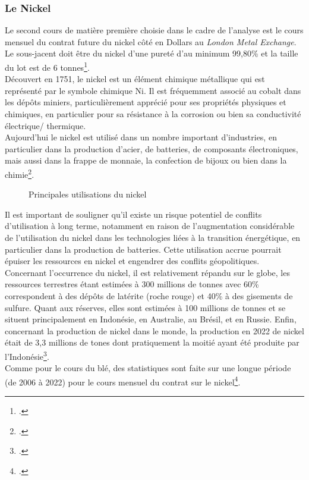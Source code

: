 \subsubsection{Le Nickel}
Le second cours de matière première choisie dans le cadre de l'analyse est le cours mensuel du contrat future du nickel côté en Dollars au \textit{London 
Metal Exchange}. Le sous-jacent doit être du nickel d'une pureté d'au minimum 99,80\% et la taille du lot est de 6 tonnes\footcite{lme_nickel}.\\[11pt]
Découvert en 1751, le nickel est un élément chimique métallique qui est représenté par le symbole chimique Ni. Il est fréquemment associé au cobalt dans les dépôts 
miniers, particulièrement apprécié pour ses propriétés physiques et chimiques, en particulier pour sa résistance à la corrosion ou bien sa conductivité électrique/
thermique. \\[11pt]
Aujourd'hui le nickel est utilisé dans un nombre important d'industries, en particulier dans la production  
d'acier, de batteries, de composants électroniques, mais aussi dans la frappe de monnaie, la confection de bijoux ou bien dans la chimie\footcite{about_nickel}.
\begin{figure}[H]
    \centering
    \resizebox{0.8\textwidth}{!}{}
    \caption{Principales utilisations du nickel}
\end{figure}
Il est important de souligner qu'il existe un risque potentiel de conflits d'utilisation à long terme, notamment en raison de l'augmentation considérable de l'utilisation 
du nickel dans les technologies liées à la transition énergétique, en particulier dans la production de batteries. Cette utilisation accrue pourrait épuiser les ressources 
en nickel et engendrer des conflits géopolitiques.\\[11pt]
Concernant l'occurrence du nickel, il est relativement répandu sur le globe, les ressources terrestres étant estimées à 300 millions de tonnes avec 60\% correspondent à 
des dépôts de latérite (roche rouge) et 40\% à des gisements de sulfure. Quant aux réserves, elles sont estimées à 100 millions de tonnes et se 
situent principalement en Indonésie, en Australie, au Brésil, et en Russie. Enfin, concernant la production de nickel dans le monde, la production en 2022 de nickel était
de 3,3 millions de tones dont pratiquement la moitié ayant été produite par l'Indonésie\footcite{info_nickel}.\\[11pt]
Comme pour le cours du blé, des statistiques sont faite sur une longue période (de 2006 à 2022) pour le cours mensuel du contrat sur le nickel\footcite{nickel}.
